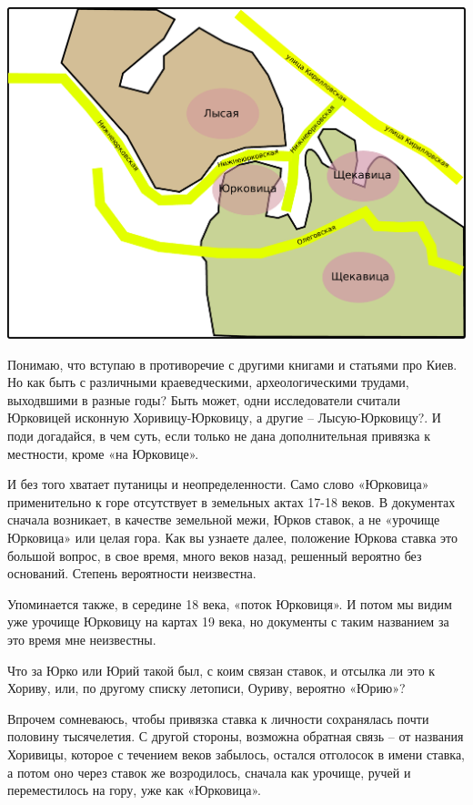 \begin{center}
\includegraphics[width=\linewidth]{chast-kirvys/poisk-yourk/yourk-pravilno.pdf}
\end{center} 

Понимаю, что вступаю в противоречие с другими книгами и статьями про Киев. Но как быть с различными краеведческими, археологическими трудами, выходвшими в разные годы? Быть может, одни исследователи считали Юрковицей исконную Хоривицу-Юрковицу, а другие – Лысую-Юрковицу?. И поди догадайся, в чем суть, если только не дана дополнительная привязка к местности, кроме «на Юрковице».

И без того хватает путаницы и неопределенности. Само слово «Юрковица» применительно к горе отсутствует в земельных актах 17-18 веков. В документах сначала возникает, в качестве земельной межи, Юрков ставок, а не «урочище Юрковица» или целая гора. Как вы узнаете далее, положение Юркова ставка это большой вопрос, в свое время, много веков назад, решенный вероятно без оснований. Степень вероятности неизвестна.

Упоминается также, в середине 18 века, «поток Юрковиця». И потом мы видим уже урочище Юрковицу на картах 19 века, но документы с таким названием за это время мне неизвестны.

Что за Юрко или Юрий такой был, с коим связан ставок, и отсылка ли это к Хориву, или, по другому списку летописи, Оуриву, вероятно «Юрию»? 

Впрочем сомневаюсь, чтобы привязка ставка к личности сохранялась почти половину тысячелетия. С другой стороны, возможна обратная связь – от названия Хоривицы, которое с течением веков забылось, остался отголосок в имени ставка, а потом оно через ставок же возродилось, сначала как урочище, ручей и переместилось на гору, уже как «Юрковица».

